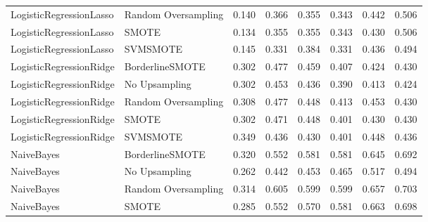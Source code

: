 \begin{tabular}{llllllll}
     LogisticRegressionLasso & Random Oversampling & 0.140 &                     0.366 &                 0.355 &                  0.343 &                                   0.442 &    0.506 \\
     LogisticRegressionLasso &               SMOTE & 0.134 &                     0.355 &                 0.355 &                  0.343 &                                   0.430 &    0.506 \\
     LogisticRegressionLasso &            SVMSMOTE & 0.145 &                     0.331 &                 0.384 &                  0.331 &                                   0.436 &    0.494 \\
     LogisticRegressionRidge &     BorderlineSMOTE & 0.302 &                     0.477 &                 0.459 &                  0.407 &                                   0.424 &    0.430 \\
     LogisticRegressionRidge &       No Upsampling & 0.302 &                     0.453 &                 0.436 &                  0.390 &                                   0.413 &    0.424 \\
     LogisticRegressionRidge & Random Oversampling & 0.308 &                     0.477 &                 0.448 &                  0.413 &                                   0.453 &    0.430 \\
     LogisticRegressionRidge &               SMOTE & 0.302 &                     0.471 &                 0.448 &                  0.401 &                                   0.430 &    0.430 \\
     LogisticRegressionRidge &            SVMSMOTE & 0.349 &                     0.436 &                 0.430 &                  0.401 &                                   0.448 &    0.436 \\
                  NaiveBayes &     BorderlineSMOTE & 0.320 &                     0.552 &                 0.581 &                  0.581 &                                   0.645 &    0.692 \\
                  NaiveBayes &       No Upsampling & 0.262 &                     0.442 &                 0.453 &                  0.465 &                                   0.517 &    0.494 \\
                  NaiveBayes & Random Oversampling & 0.314 &                     0.605 &                 0.599 &                  0.599 &                                   0.657 &    0.703 \\
                  NaiveBayes &               SMOTE & 0.285 &                     0.552 &                 0.570 &                  0.581 &                                   0.663 &    0.698 \\

\end{tabular}
